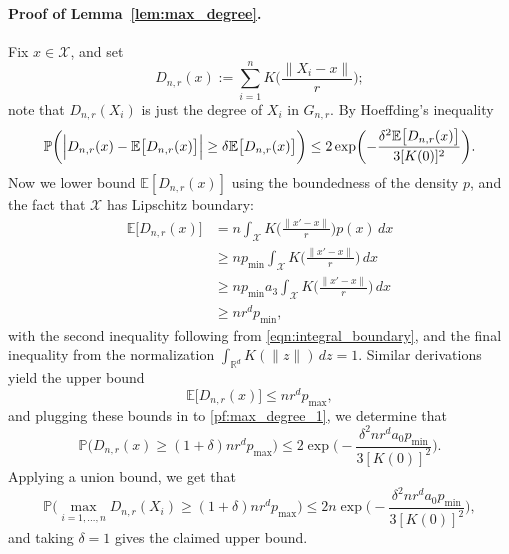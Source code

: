 \documentclass[twoside]{article}
\newcommand{\Reals}{\mathbb{R}}
\newcommand{\1}{\mathbf{1}}
\newcommand{\Rd}{\Reals^d}
\newcommand{\Xset}{\mathcal{X}}
\newcommand{\Pbb}{\mathbb{P}}
\newcommand{\Ebb}{\mathbb{E}}
\theoremstyle{definition}
\theoremstyle{remark}
\begin{document}
\paragraph{Proof of Lemma~\ref{lem:max_degree}.}
Fix $x \in \Xset$, and set
\begin{equation*}
D_{n,r}(x) :=  \sum_{i = 1}^{n} K\biggl(\frac{\|X_i - x\|}{r}\biggr);
\end{equation*}
note that $D_{n,r}(X_i)$ is just the degree of $X_i$ in $G_{n,r}$. By Hoeffding's inequality
\begin{equation}
\label{pf:max_degree_1}
\Pbb\biggl(\Bigl|D_{n,r}(x) - \Ebb\bigl[D_{n,r}(x)\bigr]\Bigr| \geq \delta \Ebb\bigl[D_{n,r}(x)\bigr]\biggr) \leq 2\exp\biggl(-\frac{\delta^2\Ebb\bigl[D_{n,r}(x)\bigr]}{3[K(0)]^2}\biggr).
\end{equation}
Now we lower bound $\Ebb[D_{n,r}(x)]$ using the boundedness of the density $p$, and the fact that $\Xset$ has Lipschitz boundary:
\begin{align*}
\Ebb\bigl[D_{n,r}(x)\bigr] & = n \int_{\Xset} K\biggl(\frac{\|x' - x\|}{r}\biggr) p(x) \,dx \\
& \geq n p_{\min} \int_{\Xset} K\biggl(\frac{\|x' - x\|}{r}\biggr) \,dx \\
& \geq n p_{\min} a_3 \int_{\Xset} K\biggl(\frac{\|x' - x\|}{r}\biggr) \,dx \\
& \geq nr^d p_{\min},
\end{align*}
with the second inequality following from \eqref{eqn:integral_boundary}, and the final inequality from the normalization $\int_{\Rd} K(\|z\|) \,dz = 1$. Similar derivations yield the upper bound
\begin{equation*}
\Ebb\bigl[D_{n,r}(x)\bigr] \leq nr^{d} p_{\max},
\end{equation*} 
and plugging these bounds in to \eqref{pf:max_degree_1}, we determine that
\begin{equation*}
\Pbb\biggl(D_{n,r}(x) \geq (1 + \delta) nr^d p_{\max}\biggr) \leq 2\exp\biggl(-\frac{\delta^2nr^da_0p_{\min}}{3[K(0)]^2}\biggr).
\end{equation*}
Applying a union bound, we get that
\begin{equation*}
\Pbb\biggl(\max_{i = 1,\ldots,n}D_{n,r}(X_i) \geq (1 + \delta) nr^d p_{\max}\biggr) \leq 2n\exp\biggl(-\frac{\delta^2nr^da_0p_{\min}}{3[K(0)]^2}\biggr),
\end{equation*}
and taking $\delta = 1$ gives the claimed upper bound.

\clearpage


 
\end{document}

